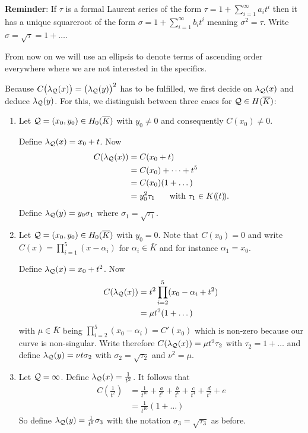 \documentclass[english,11pt,a4paper]{article}
\begin{document}
\textbf{Reminder}: If $\tau$ is a formal Laurent series of the form $\tau = 1 + \sum_{i = 1}^{\infty} a_i t^i$ then it has a unique squareroot of the form $\sigma = 1+\sum_{i = 1}^{\infty} b_i t^i$ meaning $\sigma^2 = \tau$. Write $\sigma = \sqrt \tau = 1 + \dots$.

From now on we will use an ellipsis to denote terms of ascending order everywhere where we are not interested in the specifics.

\begin{defin}
	Because $C\big(\lambda_{\mathcal{Q}}(x)\big)=\big(\lambda_{\mathcal{Q}}(y)\big)^2$ has to be fulfilled, we first decide on $\lambda_{\mathcal{Q}}(x)$ and deduce $\lambda_{\mathcal{Q}}(y)$. For this, we distinguish between three cases for $\mathcal{Q} \in H(\overline K)$:
	\begin{enumerate}[1.]
		\item Let $\mathcal{Q} =(x_0,y_0) \in H_0(\overline K)$ with $y_0 \neq 0$ and consequently $C(x_0)\neq 0$.

		Define $\lambda_{\mathcal{Q}}(x) = x_0 + t$. Now
		\begin{align*}
		  C(\lpx) &= C(x_0+t)\\
		          &= C(x_0)+ \dots + t^5\\
		          &= C(x_0)(1 + \dots)\\ %
		          &= y_0^2 \tau_1 \text{\hspace{5mm} with } \tau_1 \in K (\! (t)\! ).
		\end{align*}
		Define $\lambda_{\mathcal{Q}}(y) = y_0 \sigma_1$ where $\sigma_1 = \sqrt{\tau_1}$.

		\item Let $\mathcal{Q} =(x_0,y_0) \in H_0(\overline K)$ with $y_0 = 0$.	Note that $C(x_0)=0$ and write $C(x)=\prod_{i=1}^5 (x-\alpha_i)$ for $\alpha_i \in \bar K$ and for instance $\alpha_1 = x_0$.

		Define $\lambda_{\mathcal{Q}}(x) = x_0 + t^2$. Now
		\begin{align*}
		  C(\lambda_{\mathcal{Q}}(x)) &= t^2 \prod_{i=2}^5 (x_0 -\alpha_i + t^2) \\
		          &= \mu t^2 (1 + \dots)
		\end{align*}
		with $\mu \in \bar K$ being $\prod_{i=2}^5 (x_0 - \alpha_i) = C'(x_0)$ which is non-zero because our curve is non-singular. Write therefore $C(\lambda_{\mathcal{Q}}(x)) = \mu t^2 \tau_2$ with $\tau_2 = 1 + \dots$ and define $\lambda_{\mathcal{Q}}(y) = \nu t \sigma_2$ with $\sigma_2 = \sqrt{\tau_2}$ and $\nu^2 = \mu$.%

		\item Let $\mathcal{Q} = \infty$. Define $\lambda_{\mathcal{Q}}(x) = \frac{1}{t^2}$. It follows that
		\begin{align*}
			C(\frac{1}{t^2}) &= \frac{1}{t^{10}} + \frac{a}{t^8} + \frac{b}{t^6}
											  + \frac{c}{t^4}    + \frac{d}{t^2} + e\\
											 &= \frac{1}{t^{10}} (1 + \dots)
		\end{align*}
		So define $\lambda_{\mathcal{Q}}(y) = \frac{1}{t^5}\sigma_3$ with the notation $\sigma_3 = \sqrt{\tau_3}$ as before.
	\end{enumerate}
\end{defin}
\end{document}
